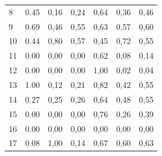 \begin{table}[ht]
\begin{tabular}{l|c|c|c|c|c|c}
        8     & 0.45                                    & 0,16                                        & 0,24      &
        0,64  & 0,36                                    & 0,46                                                      \\
        9     & 0.69                                    & 0,46                                        & 0,55      &
        0,63  & 0,57                                    & 0,60                                                      \\
        10    & 0.44                                    & 0,80                                        & 0,57      &
        0,45  & 0,72                                    & 0,55                                                      \\
        11    & 0.00                                    & 0,00                                        & 0,00      &
        0,62  & 0,08                                    & 0,14                                                      \\
        12    & 0.00                                    & 0,00                                        & 0,00      &
        1,00  & 0,02                                    & 0,04                                                      \\
        13    & 1.00                                    & 0,12                                        & 0,21      &
        0,82  & 0,42                                    & 0,55                                                      \\
        14    & 0.27                                    & 0,25                                        & 0,26      &
        0,64  & 0,48                                    & 0,55                                                      \\
        15    & 0.00                                    & 0,00                                        & 0,00      &
        0,76  & 0,26                                    & 0,39                                                      \\
        16    & 0.00                                    & 0,00                                        & 0,00      &
        0,00  & 0,00                                    & 0,00                                                      \\
        17    & 0.08                                    & 1,00                                        & 0,14      &
        0,67  & 0,60                                    & 0,63                                                      \\

\end{tabular}
\end{table}
